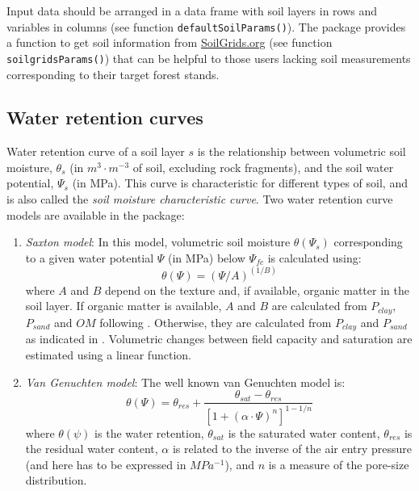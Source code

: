 \documentclass[]{book}
\providecommand{\tightlist}{%
  \setlength{\itemsep}{0pt}\setlength{\parskip}{0pt}}
\begin{document}
Input data should be arranged in a data frame with soil layers in rows and variables in columns (see function \texttt{defaultSoilParams()}). The package provides a function to get soil information from \href{https://soilgrids.org/}{SoilGrids.org} (see function \texttt{soilgridsParams()}) that can be helpful to those users lacking soil measurements corresponding to their target forest stands.

\hypertarget{water-retention-curves}{%
\subsection{Water retention curves}\label{water-retention-curves}}

Water retention curve of a soil layer \(s\) is the relationship between volumetric soil moisture, \(\theta_s\) (in \(m^3 \cdot m^{-3}\) of soil, excluding rock fragments), and the soil water potential, \(\Psi_s\) (in MPa). This curve is characteristic for different types of soil, and is also called the \emph{soil moisture characteristic curve}. Two water retention curve models are available in the package:

\begin{enumerate}
\def\labelenumi{\arabic{enumi}.}
\tightlist
\item
  \emph{Saxton model}: In this model, volumetric soil moisture \(\theta(\Psi_s)\) corresponding to a given water potential \(\Psi\) (in MPa) below \(\Psi_{fc}\) is calculated using:
  \begin{equation}\theta(\Psi) = (\Psi/A)^{(1/B)}\end{equation}
  where \(A\) and \(B\) depend on the texture and, if available, organic matter in the soil layer. If organic matter is available, \(A\) and \(B\) are calculated from \(P_{clay}\), \(P_{sand}\) and \(OM\) following \citet{Saxton2006}. Otherwise, they are calculated from \(P_{clay}\) and \(P_{sand}\) as indicated in \citet{Saxton1986}. Volumetric changes between field capacity and saturation are estimated using a linear function.
\item
  \emph{Van Genuchten model}: The well known van Genuchten \citeyearpar{Genuchten1980} model is:
  \begin{equation}\theta(\Psi) = \theta_{res}+\frac{\theta_{sat}-\theta_{res}}{\left[1+ (\alpha \cdot \Psi)^n \right]^{1-1/n}}\end{equation}
  where \(\theta(\psi)\) is the water retention, \(\theta_{sat}\) is the saturated water content, \(\theta_{res}\) is the residual water content, \(\alpha\) is related to the inverse of the air entry pressure (and here has to be expressed in \(MPa^{-1}\)), and \(n\) is a measure of the pore-size distribution.
\end{enumerate}
\end{document}
